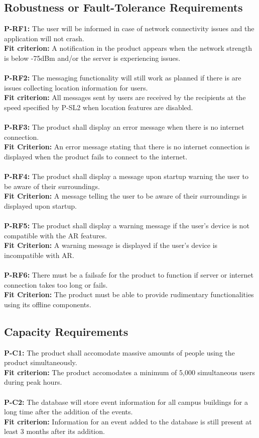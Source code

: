 \documentclass[12pt]{article}
\begin{document}
\subsection{Robustness or Fault-Tolerance Requirements}
  \textbf{P-RF1:} The user will be informed in case of network connectivity issues and the application will not crash.\\
  \textbf{Fit criterion:} A notification in the product appears when the network strength is below -75dBm and/or the server is experiencing issues.\\\\
  \textbf{P-RF2:} The messaging functionality will still work as planned if there is are issues collecting location information for users.\\
  \textbf{Fit criterion:} All messages sent by users are received by the recipients at the speed specified by P-SL2 when location features are disabled.\\\\
  \textbf{P-RF3:} The product shall display an error message when there is no internet connection.\\
  \textbf{Fit Criterion:} An error message stating that there is no internet connection is displayed when the product fails to connect to the internet.\\\\
  \textbf{P-RF4:} The product shall display a message upon startup warning the user to be aware of their surroundings.\\
   \textbf{Fit Criterion:} A message telling the user to be aware of their surroundings is displayed upon startup.\\\\
  \textbf{P-RF5:} The product shall display a warning message if the user's device is not compatible with the AR features.\\
  \textbf{Fit Criterion:} A warning message is displayed if the user's device is incompatible with AR.\\\\
  \textbf{P-RF6:} There must be a failsafe for the product to function if server or internet connection takes too long or fails.\\
  \textbf{Fit Criterion:} The product must be able to provide rudimentary functionalities using its offline components.\\
\subsection{Capacity Requirements}
  \textbf{P-C1:} The product shall accomodate massive amounts of people using the product simultaneously.\\
  \textbf{Fit criterion:} The product accomodates a minimum of 5,000 simultaneous users during peak hours.\\\\
  \textbf{P-C2:} The database will store event information for all campus buildings for a long time after the addition of the events.\\
  \textbf{Fit criterion:} Information for an event added to the database is still present at least 3 months after its addition.\\
\end{document}
